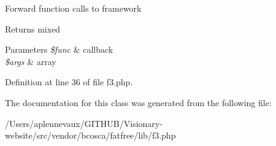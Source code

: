 Forward function calls to framework \begin{DoxyReturn}{Returns}
mixed 
\end{DoxyReturn}

\begin{DoxyParams}{Parameters}
{\em \$func} & callback \\
\hline
{\em \$args} & array \\
\hline
\end{DoxyParams}


Definition at line 36 of file f3.\+php.



The documentation for this class was generated from the following file\+:\begin{DoxyCompactItemize}
\item 
/\+Users/aplennevaux/\+G\+I\+T\+H\+U\+B/\+Visionary-\/website/src/vendor/bcosca/fatfree/lib/f3.\+php\end{DoxyCompactItemize}
